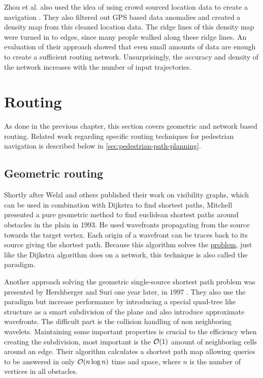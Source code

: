 		Zhou et al. also used the idea of using crowd sourced location data to create a navigation \cite{zhou-crowd-sourced-navigation}.
		They also filtered out GPS based data anomalies and created a density map from this cleaned location data.
		The ridge lines of this density map were turned in to edges, since many people walked along these ridge lines.
		An evaluation of their approach showed that even small amounts of data are enough to create a sufficient routing network.
		Unsurprisingly, the accuracy and density of the network increases with the number of input trajectories.
	
\section{Routing}

	As done in the previous chapter, this section covers geometric and network based routing.
	Related work regarding specific routing techniques for pedestrian navigation is described below in \cref{sec:pedestrian-path-planning}.
	
	\subsection{Geometric routing}
	
		\label{related-work:mitchell}
		Shortly after Welzl and others published their work on visibility graphs, which can be used in combination with Dijkstra to find shortest paths, Mitchell presented a pure geometric method to find euclidean shortest paths around obstacles in the plain in 1993\cite{mitchell-shortest-path}.
		He used wavefronts propagating from the source towards the target vertex.
		Each origin of a wavefront can be traces back to its source giving the shortest path.
		Because this algorithm solves the \hyperref[subsubsec:single-source-shortest-path]{ problem}, just like the Dijkstra algorithm does on a network, this technique is also called the  paradigm.
		
		Another approach solving the geometric single-source shortest path problem was presented by Hershberger and Suri one year later, in 1997 \cite{hershberger-suri}.
		They also use the  paradigm but increase performance by introducing a special quad-tree like structure as a smart subdivision of the plane and also introduce approximate wavefronts.
		The difficult part is the collision handling of non neighboring wavelets.
		Maintaining some important properties is crucial to the efficiency when creating the subdivision, most important is the $\mathcal{O}(1)$ amount of neighboring cells around an edge.
		Their algorithm calculates a shortest path map allowing queries to be answered in only $\mathcal{O}(n \log n)$ time and space, where $n$ is the number of vertices in all obstacles.
		
